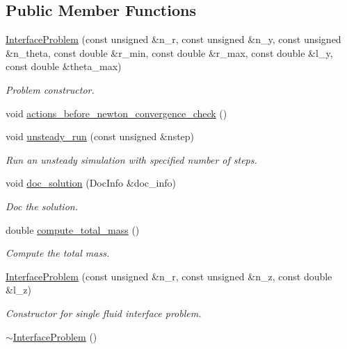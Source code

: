 \subsection*{Public Member Functions}
\begin{DoxyCompactItemize}
\item 
\hyperlink{classInterfaceProblem_a2ecc265740dba1626344fc090fad5fa6}{Interface\+Problem} (const unsigned \&n\+\_\+r, const unsigned \&n\+\_\+y, const unsigned \&n\+\_\+theta, const double \&r\+\_\+min, const double \&r\+\_\+max, const double \&l\+\_\+y, const double \&theta\+\_\+max)
\begin{DoxyCompactList}\small\item\em Problem constructor. \end{DoxyCompactList}\item 
void \hyperlink{classInterfaceProblem_ab4193771472aefce4cd67261491cc344}{actions\+\_\+before\+\_\+newton\+\_\+convergence\+\_\+check} ()
\item 
void \hyperlink{classInterfaceProblem_a241f0290d26462badbe9bb0e1e0d10a5}{unsteady\+\_\+run} (const unsigned \&nstep)
\begin{DoxyCompactList}\small\item\em Run an unsteady simulation with specified number of steps. \end{DoxyCompactList}\item 
void \hyperlink{classInterfaceProblem_a49714e35e94f7d2af0b6ddd22b851f52}{doc\+\_\+solution} (Doc\+Info \&doc\+\_\+info)
\begin{DoxyCompactList}\small\item\em Doc the solution. \end{DoxyCompactList}\item 
double \hyperlink{classInterfaceProblem_a9b19bc90667fe8c7885d8ee113812e27}{compute\+\_\+total\+\_\+mass} ()
\begin{DoxyCompactList}\small\item\em Compute the total mass. \end{DoxyCompactList}\item 
\hyperlink{classInterfaceProblem_af1ab49eb511b5a8db27e7b4e509a0c5c}{Interface\+Problem} (const unsigned \&n\+\_\+r, const unsigned \&n\+\_\+z, const double \&l\+\_\+z)
\begin{DoxyCompactList}\small\item\em Constructor for single fluid interface problem. \end{DoxyCompactList}\item 
\hyperlink{classInterfaceProblem_a90c191f8046069099b199743e7ce7111}{$\sim$\+Interface\+Problem} ()

\end{DoxyCompactItemize}

